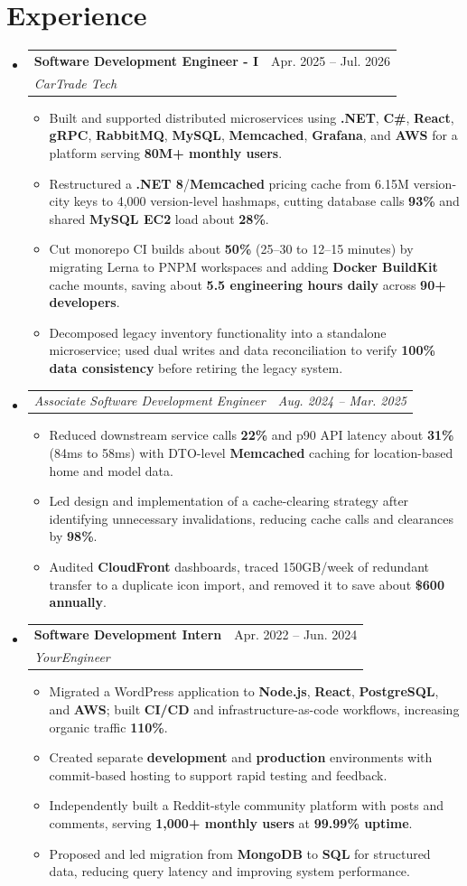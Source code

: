\documentclass[letterpaper,11pt]{article}
\makeatletter
\newcommand{\resumeItem}[1]{
  \item\small{{#1 \vspace{-2pt}}}
}
\newcommand{\resumeSubheading}[4]{
  \vspace{-2pt}\item
    \begin{tabular*}{0.97\textwidth}[t]{l@{\extracolsep{\fill}}r}
      \textbf{#1} & #2 \\
      \textit{\small#3} & \textit{\small #4} \\
    \end{tabular*}\vspace{-7pt}
}
\newcommand{\resumeSubSubheading}[2]{
    \item
    \begin{tabular*}{0.97\textwidth}{l@{\extracolsep{\fill}}r}
      \textit{\small#1} & \textit{\small #2} \\
    \end{tabular*}\vspace{-7pt}
}
\newcommand{\resumeSubHeadingListStart}{\begin{itemize}[leftmargin=0.15in, label={}]}
\newcommand{\resumeSubHeadingListEnd}{\end{itemize}}
\newcommand{\resumeItemListStart}{\begin{itemize}}
\newcommand{\resumeItemListEnd}{\end{itemize}\vspace{-5pt}}
\makeatother
\begin{document}
\section{Experience}
\resumeSubHeadingListStart
\resumeSubheading
{Software Development Engineer - I}{Apr. 2025 -- Jul. 2026}
{CarTrade Tech}{}
\resumeItemListStart
\resumeItem{Built and supported distributed microservices using \textbf{.NET}, \textbf{C\#}, \textbf{React}, \textbf{gRPC}, \textbf{RabbitMQ}, \textbf{MySQL}, \textbf{Memcached}, \textbf{Grafana}, and \textbf{AWS} for a platform serving \textbf{80M+ monthly users}.}
\resumeItem{Restructured a \textbf{.NET 8}/\textbf{Memcached} pricing cache from 6.15M version-city keys to 4,000 version-level hashmaps, cutting database calls \textbf{93\%} and shared \textbf{MySQL EC2} load about \textbf{28\%}.}
\resumeItem{Cut monorepo CI builds about \textbf{50\%} (25--30 to 12--15 minutes) by migrating Lerna to PNPM workspaces and adding \textbf{Docker BuildKit} cache mounts, saving about \textbf{5.5 engineering hours daily} across \textbf{90+ developers}.}
\resumeItem{Decomposed legacy inventory functionality into a standalone microservice; used dual writes and data reconciliation to verify \textbf{100\% data consistency} before retiring the legacy system.}
\resumeItemListEnd
\resumeSubSubheading
{Associate Software Development Engineer}{Aug. 2024 -- Mar. 2025}
\resumeItemListStart
\resumeItem{Reduced downstream service calls \textbf{22\%} and p90 API latency about \textbf{31\%} (84ms to 58ms) with DTO-level \textbf{Memcached} caching for location-based home and model data.}
\resumeItem{Led design and implementation of a cache-clearing strategy after identifying unnecessary invalidations, reducing cache calls and clearances by \textbf{98\%}.}
\resumeItem{Audited \textbf{CloudFront} dashboards, traced 150GB/week of redundant transfer to a duplicate icon import, and removed it to save about \textbf{\$600 annually}.}
\resumeItemListEnd
\resumeSubheading
{Software Development Intern}{Apr. 2022 -- Jun. 2024}
{YourEngineer}{}
\resumeItemListStart
\resumeItem{Migrated a WordPress application to \textbf{Node.js}, \textbf{React}, \textbf{PostgreSQL}, and \textbf{AWS}; built \textbf{CI/CD} and infrastructure-as-code workflows, increasing organic traffic \textbf{110\%}.}
\resumeItem{Created separate \textbf{development} and \textbf{production} environments with commit-based hosting to support rapid testing and feedback.}
\resumeItem{Independently built a Reddit-style community platform with posts and comments, serving \textbf{1,000+ monthly users} at \textbf{99.99\% uptime}.}
\resumeItem{Proposed and led migration from \textbf{MongoDB} to \textbf{SQL} for structured data, reducing query latency and improving system performance.}
\resumeItemListEnd
\resumeSubHeadingListEnd
\end{document}
